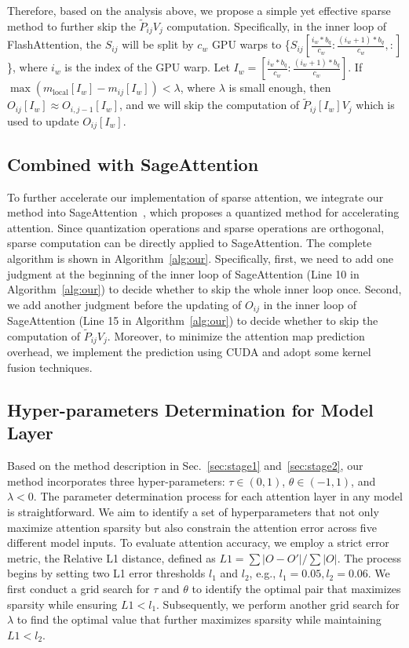 Therefore, based on the analysis above, we propose a simple yet effective sparse method to further skip the $\widetilde P_{ij} V_j$ computation. 
Specifically, in the inner loop of FlashAttention, the $S_{ij}$ will be split by $c_w$ GPU warps to \{$S_{ij}[\frac{i_w*b_q}{c_w}:\frac{(i_w+1)*b_q}{c_w}, :]$\}, where $i_w$ is the index of the GPU warp. Let $I_w = [\frac{i_w*b_q}{c_w}:\frac{(i_w+1)*b_q}{c_w}]$.
If $\max(m_\text{local}[I_w] - m_{ij}[I_w]) < \lambda$, where $\lambda$ is small enough, then $O_{ij}[I_w] \approx O_{i,j-1}[I_w]$, and we will skip the computation of $\widetilde P_{ij}[I_w] V_j$ which is used to update $O_{ij}[I_w]$. 


\subsection{Combined with SageAttention}
To further accelerate our implementation of sparse attention, we integrate our method into SageAttention~\cite{2024sageattention}, which proposes a quantized method for accelerating attention. Since quantization operations and sparse operations are orthogonal, sparse computation can be directly applied to SageAttention. 
The complete algorithm is shown in Algorithm~\ref{alg:our}.
Specifically, first, we need to add one judgment at the beginning of the inner loop of SageAttention (Line 10 in Algorithm~\ref{alg:our}) to decide whether to skip the whole inner loop once.
Second, we add another judgment before the updating of $O_{ij}$ in the inner loop of SageAttention (Line 15 in Algorithm~\ref{alg:our}) to decide whether to skip the computation of $\widetilde P_{ij} V_j$. 
Moreover, to minimize the attention map prediction overhead, we implement the prediction using CUDA and adopt some kernel fusion techniques.

\subsection{Hyper-parameters Determination for Model Layer}  \label{sec:hyper-para}
Based on the method description in Sec.~\ref{sec:stage1} and~\ref{sec:stage2}, our method incorporates three hyper-parameters: $\tau \in (0,1)$, $\theta \in (-1,1)$, and $\lambda<0$. 
The parameter determination process for each attention layer in any model is straightforward. We aim to identify a set of hyperparameters that not only maximize attention sparsity but also constrain the attention error across five different model inputs. To evaluate attention accuracy, we employ a strict error metric, the Relative L1 distance, defined as \(L1 = \sum |O - O'| / \sum |O|\). The process begins by setting two L1 error thresholds $l_1$ and $l_2$, e.g., $l_1=0.05, l_2=0.06$. 
We first conduct a grid search for \(\tau\) and \(\theta\) to identify the optimal pair that maximizes sparsity while ensuring \(L1 < l_1\). Subsequently, we perform another grid search for \(\lambda\) to find the optimal value that further maximizes sparsity while maintaining \(L1 < l_2\).

